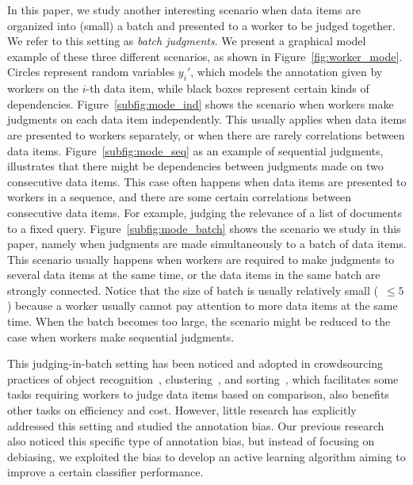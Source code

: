 In this paper, we study another interesting scenario when data items are organized into (small) a batch 
and presented to a worker to be judged together.  
We refer to this setting as \emph{batch judgments}.  
We present a graphical model example of these three different scenarios, as shown in Figure~\ref{fig:worker_mode}.  
Circles represent random variables $y_i'$, which models the annotation given by workers on the $i$-th data item, 
while black boxes represent certain kinds of dependencies.  
Figure~\ref{subfig:mode_ind} shows the scenario when workers make judgments on each data item independently.  
This usually applies when data items are presented to workers separately, 
or when there are rarely correlations between data items.  
Figure~\ref{subfig:mode_seq} as an example of sequential judgments, 
illustrates that there might be dependencies between judgments made on two consecutive data items.  
This case often happens when data items are presented to workers in a sequence, 
and there are some certain correlations between consecutive data items.  
For example, judging the relevance of a list of documents to a fixed query.  
Figure~\ref{subfig:mode_batch} shows the scenario we study in this paper, 
namely when judgments are made simultaneously to a batch of data items.  
This scenario usually happens when workers are required to make judgments to several data items at the same time, 
or the data items in the same batch are strongly connected.  
Notice that the size of batch is usually relatively small (\eg~$\leq 5$) 
because a worker usually cannot pay attention to more data items at the same time.  
When the batch becomes too large, the scenario might be reduced to the case when workers make sequential judgments.  



This judging-in-batch setting has been noticed and adopted in crowdsourcing practices of 
object recognition~\cite{su:aaai2012}, clustering~\cite{gomes:nips2011}, and sorting~\cite{marcus:vldb2011}, 
which facilitates some tasks requiring workers to judge data items based on comparison, 
also benefits other tasks on efficiency and cost.  
However, little research has explicitly addressed this setting and studied the annotation bias.  
Our previous research~\cite{zhuang:wsdm2015} also noticed this specific type of annotation bias, 
but instead of focusing on debiasing, 
we exploited the bias to develop an active learning algorithm aiming to improve a certain classifier performance.  



